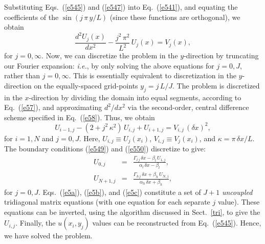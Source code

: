 Substituting Eqs.~(\ref{e545}) and (\ref{e547}) into Eq.~(\ref{e541}), and equating
the coefficients of the $\sin(j\,\pi\,y/L)$ (since these functions are orthogonal), we
obtain
\begin{equation}
\frac{d^2 U_j(x)}{dx^2} - \frac{j^2\,\pi^2}{L^2}\,U_j(x) = V_j(x),
\end{equation}
for $j=0,\infty$. Now, we can discretize the problem in the $y$-direction by truncating our
Fourier expansion: {\em i.e.}, by only solving the above equations for $j=0,J$, rather
than $j=0,\infty$. This is essentially equivalent to discretization in the $y$-direction on the 
equally-spaced grid-points
$y_j=j\,L/J$.
The problem is discretized in the $x$-direction by dividing the domain
into equal segments, according to Eq.~(\ref{e57}), and approximating $d^2/dx^2$ via the
second-order, central difference scheme specified in Eq.~(\ref{e58}). Thus, we obtain
\begin{equation}\label{e5a}
U_{i-1,j} - (2+j^2\,\kappa^2)\,U_{i,j} + U_{i+1,j} = V_{i,j}\,(\delta x)^2,
\end{equation}
for $i=1,N$ and $j=0,J$. Here, $U_{i,j} \equiv U_j(x_i)$, $V_{i,j} \equiv V_j(x_i)$, and
$\kappa = \pi\,\delta x/L$. The
boundary conditions (\ref{e549}) and (\ref{e550}) discretize to give:
\begin{eqnarray}\label{e5b}
U_{0,j}&=& \frac{\Gamma_{l\,j}\,\delta x-\beta_l\,U_{1,j}}{\alpha_l\,\delta x -\beta_l},\\[0.5ex]
U_{N+1,j}&=& \frac{\Gamma_{h\,j}\,\delta x + \beta_h\,U_{N,j}}{\alpha_h\,\delta x +\beta_h},\label{e5c}
\end{eqnarray}
for $j=0,J$. Eqs.~(\ref{e5a}), (\ref{e5b}), and (\ref{e5c}) constitute a set of $J+1$
{\em uncoupled} tridiagonal matrix equations (with one equation for each separate $j$ value).
These equations can be inverted, using the algorithm discussed in Sect.~\ref{tri}, to
give the $U_{i,j}$. Finally, the $u(x_i, y_j)$ values can be reconstructed from Eq.~(\ref{e545}).
Hence, we have solved the problem.


